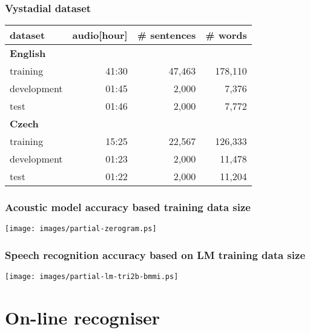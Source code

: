 \begin{frame}\frametitle{Vystadial dataset} 
    \begin{tabular}{lrrr}
        \hline
        dataset & audio[hour] & \# sentences & \# words \\
        \hline
        \textbf{English} & & & \\
                training & 41:30 & 47,463 & 178,110 \\
                development & 01:45 & 2,000 & 7,376 \\
                test & 01:46 & 2,000 & 7,772 \\
        \hline
        \textbf{Czech} & & & \\
                training & 15:25 & 22,567 & 126,333 \\
                development & 01:23 & 2,000 & 11,478 \\
                test & 01:22 & 2,000 & 11,204 \\
        \hline
		\end{tabular}
\end{frame}

\begin{frame}\frametitle{Acoustic model accuracy based training data size} 
    \begin{center}
        \texttt{[image: images/partial-zerogram.ps]}
    \end{center}
\end{frame}

\begin{frame}\frametitle{Speech recognition accuracy based on LM training data size} 
    \begin{center}
        \texttt{[image: images/partial-lm-tri2b-bmmi.ps]}
    \end{center}
\end{frame}


\section{On-line recogniser} %

